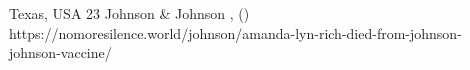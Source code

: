           {Texas, USA}
          {23}
          {Johnson \& Johnson}
          {}
          {,  ()}
          {https://nomoresilence.world/johnson/amanda-lyn-rich-died-from-johnson-johnson-vaccine/}
